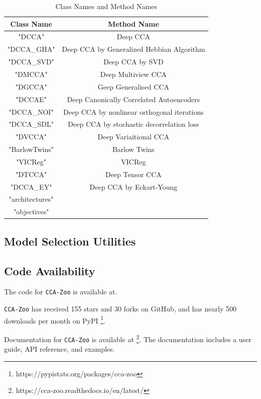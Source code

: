\begin{table}[ht]
    \centering
    \begin{tabular}{|c|c|}
        \hline
        Class Name & Method Name \\
        \hline
        "DCCA" & Deep CCA \\
        "DCCA_GHA" & Deep CCA by Generalized Hebbian Algorithm \\
        "DCCA_SVD" & Deep CCA by SVD \\
        "DMCCA" & Deep Multiview CCA \\
        "DGCCA" & Geep Generalised CCA \\
        "DCCAE" & Deep Canonically Correlated Autoencoders \\
        "DCCA_NOI" & Deep CCA by nonlinear orthogonal iterations \\
        "DCCA_SDL" & Deep CCA by stochastic decorrelation loss \\
        "DVCCA" & Deep Variaitional CCA \\
        "BarlowTwins" & Barlow Twins \\
        "VICReg" & VICReg \\
        "DTCCA" & Deep Tensor CCA \\
        "DCCA_EY" & Deep CCA by Eckart-Young \\
        "architectures" & \\
        "objectives" & \\
        \hline
    \end{tabular}
    \caption{Class Names and Method Names}
    \label{tab:class_method_2}
\end{table}

\subsection{Model Selection Utilities}



\subsection{Code Availability}

The code for \texttt{CCA-Zoo} is available at.

\texttt{CCA-Zoo} has received 155 stars and 30 forks on GitHub, and has nearly 500 downloads per month on PyPI \footnote{https://pypistats.org/packages/cca-zoo}.

Documentation for \texttt{CCA-Zoo} is available at \footnote{https://cca-zoo.readthedocs.io/en/latest/}.
The documentation includes a user guide, API reference, and examples.

